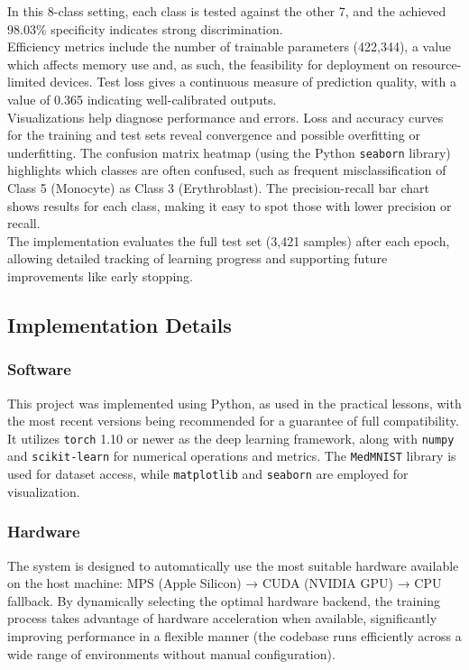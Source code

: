 \documentclass[runningheads]{llncs}
\begin{document}
\noindent
In this 8-class setting, each class is tested against the other 7, and the achieved 98.03\% specificity indicates strong discrimination. \\
\noindent
Efficiency metrics include the number of trainable parameters (422,344), a value which affects memory use and, as such, the feasibility for deployment on resource-limited devices. 
Test loss gives a continuous measure of prediction quality, with a value of 0.365 indicating well-calibrated outputs. \\
\noindent
Visualizations help diagnose performance and errors. 
Loss and accuracy curves for the training and test sets reveal convergence and possible overfitting or underfitting. 
The confusion matrix heatmap (using the Python \texttt{seaborn} library) highlights which classes are often confused, such as frequent misclassification of Class 5 (Monocyte) as Class 3 (Erythroblast). 
The precision-recall bar chart shows results for each class, making it easy to spot those with lower precision or recall. \\
\noindent
The implementation evaluates the full test set (3,421 samples) after each epoch, allowing detailed tracking of learning progress and supporting future improvements like early stopping.

\subsection{Implementation Details}

\subsubsection{Software}
This project was implemented using Python, as used in the practical lessons, with the most recent versions being recommended for a guarantee of full compatibility. 
It utilizes \texttt{torch} 1.10 or newer as the deep learning framework, along with \texttt{numpy} and \texttt{scikit-learn} for numerical operations and metrics. 
The \texttt{MedMNIST} library is used for dataset access, while \texttt{matplotlib} and \texttt{seaborn} are employed for visualization.

\subsubsection{Hardware}
The system is designed to automatically use the most suitable hardware available on the host machine: MPS (Apple Silicon) → CUDA (NVIDIA GPU) → CPU fallback.
By dynamically selecting the optimal hardware backend, the training process takes advantage of hardware acceleration when available, significantly improving performance in a flexible manner (the codebase runs efficiently across a wide range of environments without manual configuration).
\end{document}

